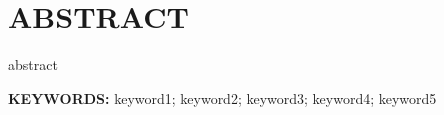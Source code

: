 \chapter*{\bf {} ABSTRACT}
\thispagestyle{frontstyle}
\markboth{}{}

{
\justifying

abstract


\vspace{0.8cm}
\noindent\textbf{KEYWORDS: }keyword1; keyword2; keyword3; keyword4; keyword5

}